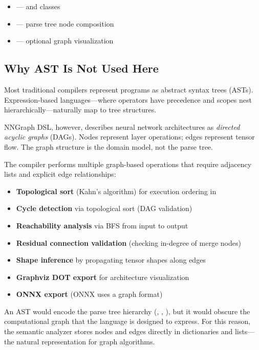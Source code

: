 \documentclass{nngraph-en}
\begin{document}
\begin{itemize}
    \item {} ---  and  classes
    \item {} --- parse tree node composition
    \item {} --- optional graph
    visualization
\end{itemize}

\subsection{Why AST Is Not Used Here}

Most traditional compilers represent programs as abstract syntax trees
(ASTs). Expression-based languages---where operators have precedence
and scopes nest hierarchically---naturally map to tree structures.

NNGraph DSL, however, describes neural network architectures as
\emph{directed acyclic graphs} (DAGs). Nodes represent layer operations;
edges represent tensor flow. The graph structure is the domain model,
not the parse tree.

The compiler performs multiple graph-based operations that require
adjacency lists and explicit edge relationships:

\begin{itemize}[noitemsep]
    \item \textbf{Topological sort} (Kahn's algorithm) for execution
    ordering in 
    \item \textbf{Cycle detection} via topological sort (DAG validation)
    \item \textbf{Reachability analysis} via BFS from input to output
    \item \textbf{Residual connection validation} (checking in-degree
    of merge nodes)
    \item \textbf{Shape inference} by propagating tensor shapes along
    edges
    \item \textbf{Graphviz DOT export} for architecture visualization
    \item \textbf{ONNX export} (ONNX uses a graph format)
\end{itemize}

An AST would encode the parse tree hierarchy (,
, ), but it would obscure the
computational graph that the language is designed to express. For this
reason, the semantic analyzer stores nodes and edges directly in
dictionaries and lists---the natural representation for graph algorithms.
\end{document}
